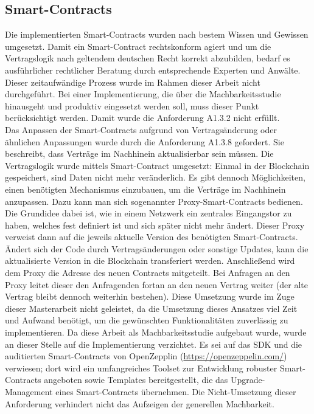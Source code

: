 \subsection{Smart-Contracts}
\label{subsec:implementation:requirements:smart_contracts}
Die implementierten Smart-Contracts wurden nach bestem Wissen und Gewissen umgesetzt. Damit ein Smart-Contract rechtskonform agiert und um die Vertragslogik nach geltendem deutschen Recht korrekt abzubilden, bedarf es ausführlicher rechtlicher Beratung durch entsprechende Experten und Anwälte. Dieser zeitaufwändige Prozess wurde im Rahmen dieser Arbeit nicht durchgeführt. Bei einer Implementierung, die über die Machbarkeitsstudie hinausgeht und produktiv eingesetzt werden soll, muss dieser Punkt berücksichtigt werden. Damit wurde die Anforderung A1.3.2 nicht erfüllt.\\
Das Anpassen der Smart-Contracts aufgrund von Vertragsänderung oder ähnlichen Anpassungen wurde durch die Anforderung A1.3.8 gefordert. Sie beschreibt, dass Verträge im Nachhinein aktualisierbar sein müssen. Die Vertragslogik wurde mittels Smart-Contract umgesetzt: Einmal in der Blockchain gespeichert, sind Daten nicht mehr veränderlich. Es gibt dennoch Möglichkeiten, einen benötigten Mechanismus einzubauen, um die Verträge im Nachhinein anzupassen. Dazu kann man sich sogenannter Proxy-Smart-Contracts bedienen. Die Grundidee dabei ist, wie in einem Netzwerk ein zentrales Eingangstor zu haben, welches fest definiert ist und sich später nicht mehr ändert. Dieser Proxy verweist dann auf die jeweils aktuelle Version des benötigten Smart-Contracts. Ändert sich der Code durch Vertragsänderungen oder sonstige Updates, kann die aktualisierte Version in die Blockchain transferiert werden. Anschließend wird dem Proxy die Adresse des neuen Contracts mitgeteilt. Bei Anfragen an den Proxy leitet dieser den Anfragenden fortan an den neuen Vertrag weiter (der alte Vertrag bleibt dennoch weiterhin bestehen). Diese Umsetzung wurde im Zuge dieser Masterarbeit nicht geleistet, da die Umsetzung dieses Ansatzes viel Zeit und Aufwand benötigt, um die gewünschten Funktionalitäten zuverlässig zu implementieren. Da diese Arbeit als Machbarkeitsstudie aufgebaut wurde, wurde an dieser Stelle auf die Implementierung verzichtet. Es sei auf das \ac{SDK} und die auditierten Smart-Contracts von OpenZepplin (\url{https://openzeppelin.com/}) verwiesen; dort wird ein umfangreiches Toolset zur Entwicklung robuster Smart-Contracts angeboten sowie Templates bereitgestellt, die das Upgrade-Management eines Smart-Contracts übernehmen. Die Nicht-Umsetzung dieser Anforderung verhindert nicht das Aufzeigen der generellen Machbarkeit.\\


